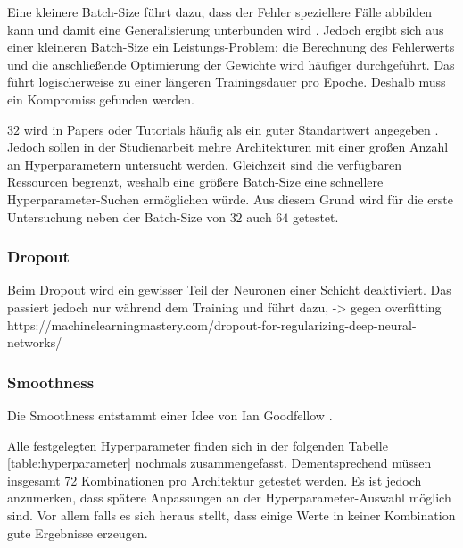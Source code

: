 Eine kleinere Batch-Size führt dazu, dass der Fehler speziellere Fälle abbilden kann und damit eine Generalisierung unterbunden wird \cite{tutorial:tune-batch-size-machinelearningmastery}.
Jedoch ergibt sich aus einer kleineren Batch-Size ein Leistungs-Problem: die Berechnung des Fehlerwerts und die anschließende Optimierung der Gewichte wird häufiger durchgeführt.
Das führt logischerweise zu einer längeren Trainingsdauer pro Epoche.
Deshalb muss ein Kompromiss gefunden werden.
\newline

\(32\) wird in Papers oder Tutorials häufig als ein guter Standartwert angegeben \cite{default-batch-size}.
Jedoch sollen in der Studienarbeit mehre Architekturen mit einer großen Anzahl an Hyperparametern untersucht werden.
Gleichzeit sind die verfügbaren Ressourcen begrenzt, weshalb eine größere Batch-Size eine schnellere Hyperparameter-Suchen ermöglichen würde.
Aus diesem Grund wird für die erste Untersuchung neben der Batch-Size von \(32\) auch \(64\) getestet.

\subsubsection{Dropout}
Beim Dropout wird ein gewisser Teil der Neuronen einer Schicht deaktiviert.
Das passiert jedoch nur während dem Training und führt dazu, -> gegen overfitting
https://machinelearningmastery.com/dropout-for-regularizing-deep-neural-networks/



\subsubsection{Smoothness}
Die Smoothness entstammt einer Idee von Ian Goodfellow \cite{ian-goodfellow-onesided-label-smoothing}.
\newline

Alle festgelegten Hyperparameter finden sich in der folgenden Tabelle \ref{table:hyperparameter} nochmals zusammengefasst.
Dementsprechend müssen insgesamt 72 Kombinationen pro Architektur getestet werden. 
Es ist jedoch anzumerken, dass spätere Anpassungen an der Hyperparameter-Auswahl möglich sind.
Vor allem falls es sich heraus stellt, dass einige Werte in keiner Kombination gute Ergebnisse erzeugen.


